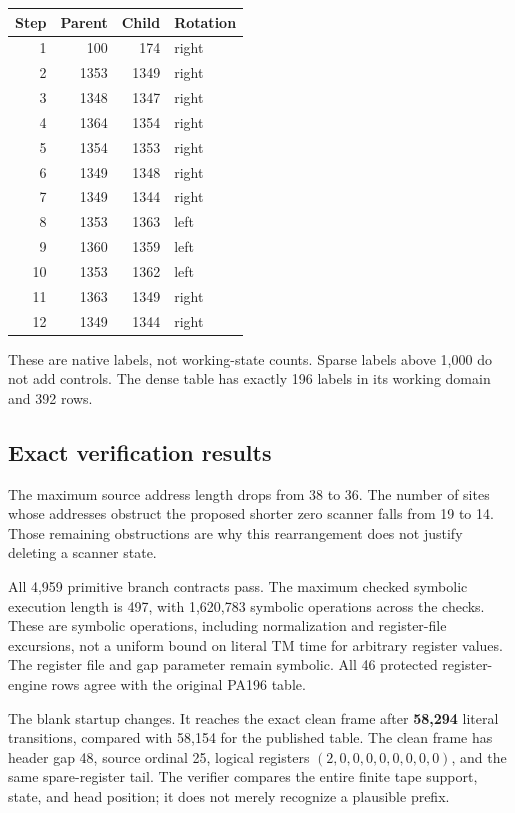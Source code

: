 \documentclass[11pt,letterpaper]{article}
\begin{document}
\begin{center}\small
\begin{tabular}{@{}rrrl@{}}
\toprule
Step & Parent & Child & Rotation\\
\midrule
1&100&174&right\\
2&1353&1349&right\\
3&1348&1347&right\\
4&1364&1354&right\\
5&1354&1353&right\\
6&1349&1348&right\\
7&1349&1344&right\\
8&1353&1363&left\\
9&1360&1359&left\\
10&1353&1362&left\\
11&1363&1349&right\\
12&1349&1344&right\\
\bottomrule
\end{tabular}
\end{center}
These are native labels, not working-state counts. Sparse labels above
1,000 do not add controls. The dense table has exactly 196 labels in its
working domain and 392 rows.

\subsection{Exact verification results}

The maximum source address length drops from 38 to 36. The number of
sites whose addresses obstruct the proposed shorter zero scanner falls
from 19 to 14. Those remaining obstructions are why this rearrangement
does not justify deleting a scanner state.

All 4,959 primitive branch contracts pass. The maximum checked symbolic
execution length is 497, with 1,620,783 symbolic operations across the
checks. These are symbolic operations, including normalization and
register-file excursions, not a uniform bound on literal TM time for
arbitrary register values. The register file and gap parameter remain
symbolic. All 46 protected register-engine rows agree with the original
PA196 table.

The blank startup changes. It reaches the exact clean frame after
\textbf{58,294} literal transitions, compared with 58,154 for the
published table. The clean frame has header gap 48, source ordinal 25,
logical registers \((2,0,0,0,0,0,0,0,0)\), and the same spare-register
tail. The verifier compares the entire finite tape support, state, and
head position; it does not merely recognize a plausible prefix.
\end{document}
